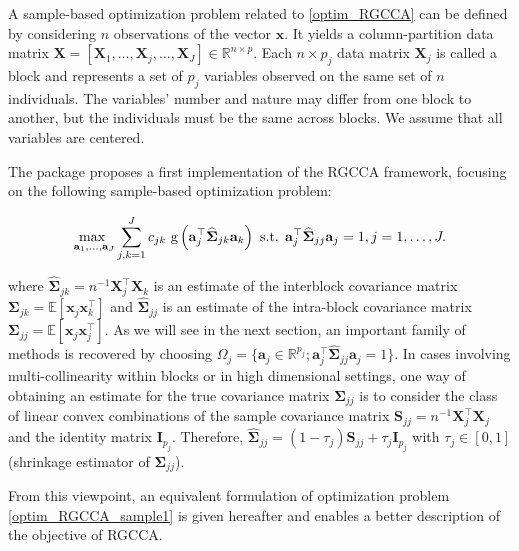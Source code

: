 \documentclass[
]{jss}
\begin{document}
A sample-based optimization problem related to \eqref{optim_RGCCA} can
be defined by considering \(n\) observations of the vector
\(\boldsymbol x\). It yields a column-partition data matrix
\(\mathbf X = [\mathbf X_1, \ldots, \mathbf X_j, \ldots, \mathbf X_J] \in \mathbb{R}^{n \times p}\).
Each \(n\times p_j\) data matrix \(\mathbf X_j\) is called a block and
represents a set of \(p_j\) variables observed on the same set of \(n\)
individuals. The variables' number and nature may differ from one block
to another, but the individuals must be the same across blocks. We
assume that all variables are centered.

The  package proposes a first implementation of the RGCCA
framework, focusing on the following sample-based optimization problem:

\begin{equation}
\underset{\mathbf{a}_1, \ldots,\mathbf{a}_J}{\text{max }}  \displaystyle  \sum_{j, k = 1}^J c_{jk} \text{
g}\left(\mathbf{a}_j^\top  \widehat{\mathbf{\Sigma}}_{jk} \mathbf{a}_k\right)\\
\text{ s.t. } \mathbf a_j^\top \widehat{\mathbf{\Sigma}}_{jj}\mathbf{a}_j = 1, j =1, \ldots, J.
\label{optim_RGCCA_sample1}
\end{equation}

where
\(\widehat{\mathbf{\Sigma}}_{jk}= n^{-1} \mathbf X_j^\top \mathbf X_k\)
is an estimate of the interblock covariance matrix
\(\mathbf{\Sigma}_{jk}= \mathbb{E}[\boldsymbol x_j\boldsymbol x_k^\top]\)
and \(\widehat{\boldsymbol \Sigma}_{jj}\) is an estimate of the
intra-block covariance matrix
\(\mathbf{\Sigma}_{jj} = \mathbb{E}[\boldsymbol x_j\boldsymbol x_j^\top]\).
As we will see in the next section, an important family of methods is
recovered by choosing
\(\Omega_j = \{\mathbf a_j \in \mathbb{R}^{p_j}; \mathbf a_j^\top \widehat{\boldsymbol \Sigma}_{jj} \mathbf a_j = 1\}\).
In cases involving multi-collinearity within blocks or in high
dimensional settings, one way of obtaining an estimate for the true
covariance matrix \(\mathbf{\Sigma}_{jj}\) is to consider the class of
linear convex combinations of the sample covariance matrix
\(\mathbf{S}_{jj} = n^{-1} \mathbf X_j^\top \mathbf X_j\) and the
identity matrix \(\mathbf I_{p_j}\). Therefore,
\(\widehat{\mathbf{\Sigma}}_{jj} = (1-\tau_j)\mathbf{S}_{jj} + \tau_j\mathbf{I}_{p_j}\)
with \(\tau_j \in [0,1]\) (shrinkage estimator of
\(\mathbf{\Sigma}_{jj}\)).

From this viewpoint, an equivalent formulation of optimization problem
\eqref{optim_RGCCA_sample1} is given hereafter and enables a better
description of the objective of RGCCA.
\end{document}
